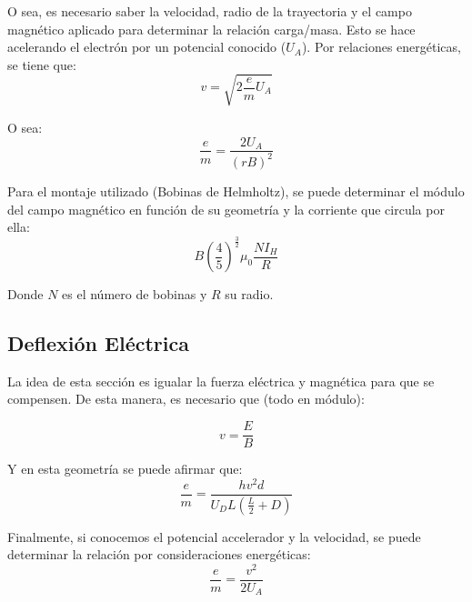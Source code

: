 \documentclass[a4paper,12pt]{article}
\begin{document}
O sea, es necesario saber la velocidad, radio de la trayectoria y el campo magnético aplicado para determinar la relación carga/masa. 
Esto se hace acelerando el electrón por un potencial conocido ($U_A$). Por relaciones energéticas, se tiene que:
$$v = \sqrt{2\frac{e}{m} U_A}$$

O sea:
$$\frac{e}{m} = \frac{2U_A}{(r B)^2} $$

Para el montaje utilizado (Bobinas de Helmholtz), se puede determinar el módulo del campo magnético en función de su geometría y la corriente que circula por ella:
$$B \left(\frac{4}{5}\right)^{\frac{3}{2}} \mu_0 \frac{N I_H}{R}$$

Donde $N$ es el número de bobinas y $R$ su radio.

\subsection{Deflexión Eléctrica}

La idea de esta sección es igualar la fuerza eléctrica y magnética para que se compensen. De esta manera, es necesario que (todo en módulo):

$$v = \frac{E}{B}$$

Y en esta geometría se puede afirmar que:
$$\frac{e}{m} = \frac{h v^2 d}{U_D L \left(\frac{L}{2} + D \right)}$$

Finalmente, si conocemos el potencial accelerador y la velocidad, se puede determinar la relación por consideraciones energéticas:
$$\frac{e}{m} = \frac{v^2}{2U_A} $$ 
\end{document}
